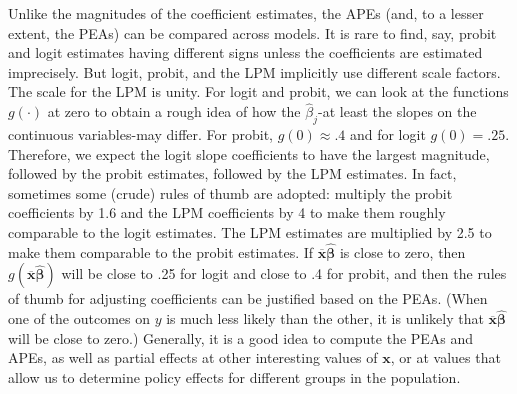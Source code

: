 \documentclass[10pt]{article}
\begin{document}
Unlike the magnitudes of the coefficient estimates, the APEs (and, to a lesser extent, the PEAs) can be compared across models. It is rare to find, say, probit and logit estimates having different signs unless the coefficients are estimated imprecisely. But logit, probit, and the LPM implicitly use different scale factors. The scale for the LPM is unity. For logit and probit, we can look at the functions $g(\cdot)$ at zero to obtain a rough idea of how the $\hat{\beta}_{j}$-at least the slopes on the continuous variables-may differ. For probit, $g(0) \approx .4$ and for logit $g(0)=.25$. Therefore, we expect the logit slope coefficients to have the largest magnitude, followed by the probit estimates, followed by the LPM estimates. In fact, sometimes some (crude) rules of thumb are adopted: multiply the probit coefficients by 1.6 and the LPM coefficients by 4 to make them roughly comparable to the logit estimates. The LPM estimates are multiplied by 2.5 to make them comparable to the probit estimates. If $\overline{\mathbf{x}} \hat{\boldsymbol{\beta}}$ is close to zero, then $g(\overline{\mathbf{x}} \hat{\boldsymbol{\beta}})$ will be close to .25 for logit and close to .4 for probit, and then the rules of thumb for adjusting coefficients can be justified based on the PEAs. (When one of the outcomes on $y$ is much less likely than the other, it is unlikely that $\overline{\mathbf{x}} \hat{\boldsymbol{\beta}}$ will be close to zero.) Generally, it is a good idea to compute the PEAs and APEs, as well as partial effects at other interesting values of $\mathbf{x}$, or at values that allow us to determine policy effects for different groups in the population.
\end{document}
